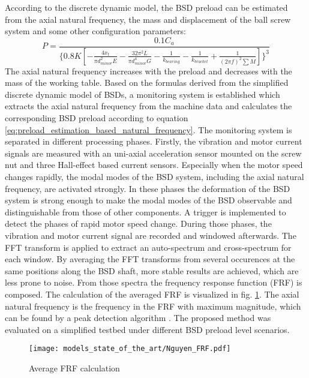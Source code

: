 According to the discrete dynamic model, the BSD preload can be estimated from the axial natural frequency, the mass and displacement of the ball screw system and some other configuration parameters:
\begin{equation}
    P=\frac{0.1C_{a}}{\{0.8K[ -\frac{4x_{t}}{\pi d_{minor}^{2}E} -\frac{32\pi^{2}L}{\pi d_{minor}^{4}G}-\frac{1}{k_{bearing}}-\frac{1}{k_{bracket}}+\frac{1}{(2\pi f)^{2}\sum M} ]\}^{3}}
\label{eq:preload_estimation_based_natural_frequency}
\end{equation}
The axial natural frequency increases with the preload and decreases with the mass of the working table. Based on the formulas derived from the simplified discrete dynamic model of BSDs, a monitoring system is established which extracts the axial natural frequency from the machine data and calculates the corresponding BSD preload according to equation \ref{eq:preload_estimation_based_natural_frequency}. The monitoring system is separated in different processing phases. Firstly, the vibration and motor current signals are measured with an uni-axial acceleration sensor mounted on the screw nut and three Hall-effect based current sensors. Especially when the motor speed changes rapidly, the modal modes of the BSD system, including the axial natural frequency, are activated strongly. In these phases the deformation of the BSD system is strong enough to make the modal modes of the BSD observable and distinguishable from those of other components. A trigger is implemented to detect the phases of rapid motor speed change. During those phases, the vibration and motor current signal are recorded and windowed afterwards. The FFT transform is applied to extract an auto-spectrum and cross-spectrum for each window. By averaging the FFT transforms from several occurences at the same positions along the BSD shaft, more stable results are achieved, which are less prone to noise. From those spectra the frequency response function (FRF) is composed. The calculation of the averaged FRF is visualized in fig. \ref{fig:Nguyen_frf}. The axial natural frequency is the frequency in the FRF with maximum magnitude, which can be found by a peak detection algorithm \cite{NGUYEN2019}. The proposed method was evaluated on a simplified testbed under different BSD preload level scenarios.

\begin{figure}[H]
  \centering
  \texttt{[image: models\_state\_of\_the\_art/Nguyen\_FRF.pdf]}
  \caption{Average FRF calculation \cite{NGUYEN2019}}
  \label{fig:Nguyen_frf}
\end{figure}

